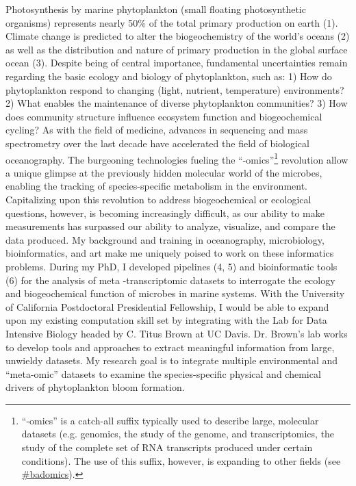 Photosynthesis by marine phytoplankton (small floating photosynthetic organisms) represents nearly 50\% of the total primary production on earth (1). Climate change is predicted to alter the biogeochemistry of the world's oceans (2) as well as the distribution and nature of primary production in the global surface ocean (3). Despite being of central importance, fundamental uncertainties remain regarding the basic ecology and biology of phytoplankton, such as: 1) How do phytoplankton respond to changing (light, nutrient, temperature) environments? 2) What enables the maintenance of diverse phytoplankton communities? 3) How does community structure influence ecosystem function and biogeochemical cycling? 
As with the field of medicine, advances in sequencing and mass spectrometry over the last decade have accelerated the field of biological oceanography. The burgeoning technologies fueling the ``-omics''\footnote{``-omics'' is a catch-all suffix typically used to describe large, molecular datasets (e.g. genomics, the study of the genome, and transcriptomics, the study of the complete set of RNA transcripts produced under certain conditions). The use of this suffix, however, is expanding to other fields (see \href{https://twitter.com/search?q=\%23badomics&src=typd&lang=en}{\#badomics}). }  revolution allow a unique glimpse at the previously hidden molecular world of the microbes, enabling the tracking of species-specific metabolism in the environment. Capitalizing upon this revolution to address biogeochemical or ecological questions, however, is becoming increasingly difficult, as our ability to make measurements has surpassed our ability to analyze, visualize, and compare the data produced. My background and training in oceanography, microbiology, bioinformatics, and art make me uniquely poised to work on these informatics problems. During my PhD, I developed pipelines (4, 5) and bioinformatic tools (6) for the analysis of meta -transcriptomic datasets to interrogate the ecology and biogeochemical function of microbes in marine systems. With the University of California Postdoctoral Presidential Fellowship, I would be able to expand upon my existing computation skill set by integrating with the Lab for Data Intensive Biology headed by C. Titus Brown at UC Davis. Dr. Brown’s lab works to develop tools and approaches to extract meaningful information from large, unwieldy datasets. My research goal is to integrate multiple environmental and “meta-omic” datasets to examine the species-specific physical and chemical drivers of phytoplankton bloom formation. 


